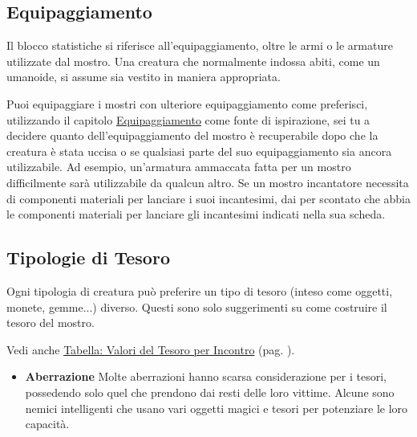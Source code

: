 \begin{multicols}{2}



\subsection{Equipaggiamento}

Il blocco statistiche si riferisce all'equipaggiamento, oltre le armi o le armature utilizzate dal mostro. Una creatura che normalmente indossa abiti, come un umanoide, si assume sia vestito in maniera appropriata.

Puoi equipaggiare i mostri con ulteriore equipaggiamento come preferisci, utilizzando il capitolo \hyperlink{equipaggiamento}{Equipaggiamento} come fonte di ispirazione, sei tu a decidere quanto dell'equipaggiamento del mostro è recuperabile dopo che la creatura è stata uccisa o se qualsiasi parte del suo equipaggiamento sia ancora utilizzabile. Ad esempio, un'armatura ammaccata fatta per un mostro difficilmente sarà utilizzabile da qualcun altro. Se un mostro incantatore necessita di componenti materiali per lanciare i suoi incantesimi, dai per scontato che abbia le componenti materiali per lanciare gli incantesimi indicati nella sua scheda.


\subsection{Tipologie di Tesoro}

Ogni tipologia di creatura può preferire un tipo di tesoro (inteso come oggetti, monete, gemme...) diverso. Questi sono solo suggerimenti su come costruire il tesoro del mostro.

Vedi anche \hyperlink{valoretesoroincontro}{Tabella: Valori del Tesoro per Incontro} (pag. \pageref{valoretesoroincontro}).

\medskip

\begin{itemize}[leftmargin=*] \setlength{\itemsep}{0pt}

	\item \textbf{Aberrazione}
	Molte aberrazioni hanno scarsa considerazione per i tesori, possedendo solo quel che prendono dai resti delle loro vittime. Alcune sono nemici intelligenti che usano vari oggetti magici e tesori per potenziare le loro capacità.


\end{itemize}
\end{multicols}
